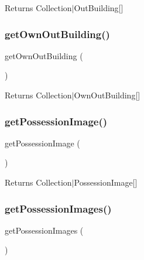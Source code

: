 \begin{DoxyReturn}{Returns}
Collection$\vert$\+Out\+Building\mbox{[}\mbox{]} 
\end{DoxyReturn}
\mbox{\label{class_app_1_1_entity_1_1_possession_aaf190d3aab26b67e86cfa0d759a0a9e6}} 
\subsubsection{\texorpdfstring{getOwnOutBuilding()}{getOwnOutBuilding()}}
{\footnotesize\ttfamily get\+Own\+Out\+Building (\begin{DoxyParamCaption}{ }\end{DoxyParamCaption})}

\begin{DoxyReturn}{Returns}
Collection$\vert$\+Own\+Out\+Building\mbox{[}\mbox{]} 
\end{DoxyReturn}
\mbox{\label{class_app_1_1_entity_1_1_possession_a9862c73c192fcf2032704752a1bfaccf}} 
\subsubsection{\texorpdfstring{getPossessionImage()}{getPossessionImage()}}
{\footnotesize\ttfamily get\+Possession\+Image (\begin{DoxyParamCaption}{ }\end{DoxyParamCaption})}

\begin{DoxyReturn}{Returns}
Collection$\vert$\+Possession\+Image\mbox{[}\mbox{]} 
\end{DoxyReturn}
\mbox{\label{class_app_1_1_entity_1_1_possession_a7643a946121fb0010af6a6d175575e49}} 
\subsubsection{\texorpdfstring{getPossessionImages()}{getPossessionImages()}}
{\footnotesize\ttfamily get\+Possession\+Images (\begin{DoxyParamCaption}{ }\end{DoxyParamCaption})}

